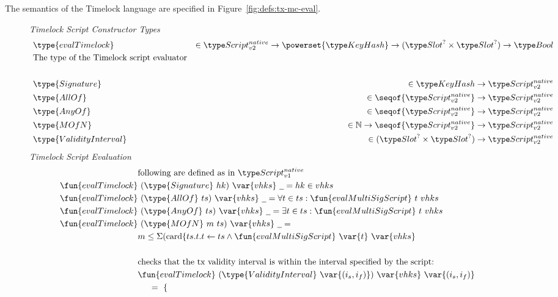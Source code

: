 The semantics of the Timelock language are specified in Figure~\ref{fig:defs:tx-mc-eval}.

\begin{figure*}[htb]
  \emph{Timelock Script Constructor Types}
  \begin{align*}
    & \type{evalTimelock} & \in\Timelock \to \powerset{\KeyHash}\to(\Slot^? \times \Slot^?)\to\Bool & \\
    & \text{The type of the Timelock script evaluator} \\~\\
    & \type{Signature} & \in \KeyHash \to \Timelock & \\
    & \type{AllOf} & \in \seqof{\Timelock} \to \Timelock & \\
    & \type{AnyOf} & \in \seqof{\Timelock} \to \Timelock & \\
    & \type{MOfN} & \in \N \to \seqof{\Timelock} \to \Timelock & \\
    & \type{ValidityInterval} & \in (\Slot^? \times \Slot^?) \to \Timelock &\\
  \end{align*}
  \emph{Timelock Script Evaluation}
  \begin{align*}
    & \text {following are defined as in $\ScriptNI$}\\
    \fun{evalTimelock} & ~(\type{Signature}~hk)~\var{vhks}~\wcard =  hk \in vhks \\
    \fun{evalTimelock} & ~(\type{AllOf}~ts)~\var{vhks}~\wcard =
                              \forall t \in ts: \fun{evalMultiSigScript}~t~vhks\\
    \fun{evalTimelock} & ~(\type{AnyOf}~ts)~\var{vhks}~\wcard =
                              \exists t \in ts: \fun{evalMultiSigScript}~t~vhks\\
    \fun{evalTimelock} & ~(\type{MOfN}~m~ts)~\var{vhks}~\wcard = \\
                             & m \leq \Sigma
                               (\textrm{card} \{ t s.t. t \leftarrow ts \wedge \fun{evalMultiSigScript}~\var{t}~\var{vhks} \\~\\
    & \text {checks that the tx validity interval is within the interval specified by the script:}\\
    & \fun{evalTimelock} ~(\type{ValidityInterval}~\var{(i_s, i_f)})~\var{vhks}~\var{(i_s, i_f)} \\
    &~~~~ =~
    \begin{cases}

\end{cases}
\end{align*}
\end{figure*}
